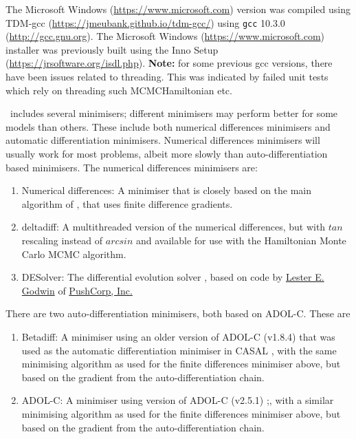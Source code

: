 The Microsoft Windows  (\url{https://www.microsoft.com}) version was compiled using TDM-gcc (\url{https://jmeubank.github.io/tdm-gcc/}) using \texttt{gcc} 10.3.0 (\url{http://gcc.gnu.org}). The Microsoft Windows (\url{https://www.microsoft.com}) installer was previously built using the Inno Setup (\url{https://jrsoftware.org/isdl.php}). \textbf{Note:} for some previous gcc versions, there have been issues related to threading. This was indicated by failed unit tests which rely on threading such MCMCHamiltonian etc.

\CNAME\ includes several minimisers; different minimisers may perform better for some models than others. These include both numerical differences minimisers and automatic differentiation minimisers. Numerical differences minimisers will usually work for most problems, albeit more slowly than auto-differentiation based minimisers. The numerical differences minimisers are:

\begin{enumerate}
\item Numerical differences: A minimiser that is closely based on the main algorithm of \cite{779}, that uses finite difference gradients.
\item deltadiff: A multithreaded version of the numerical differences, but with $tan$ rescaling instead of $arcsin$ and available for use with the Hamiltonian Monte Carlo MCMC algorithm.
\item DESolver: The differential evolution solver \citep{1442}, based on code by \href{mailto:<godwin@pushcorp.com>}{Lester E. Godwin} of \href{http://www.pushcorp.com}{PushCorp, Inc.}
\end{enumerate}

There are two auto-differentiation minimisers, both based on ADOL-C. These are
\begin{enumerate}
\item Betadiff: A minimiser using an older version of ADOL-C (v1.8.4) that was used as the automatic differentiation minimiser in CASAL \citep{1388}, with the same minimising algorithm as used for the finite differences minimiser above, but based on the gradient from the auto-differentiation chain.
\item ADOL-C: A minimiser using version of ADOL-C (v2.5.1) \citep{walther1996adolc};, with a similar minimising algorithm as used for the finite differences minimiser above, but based on the gradient from the auto-differentiation chain.
\end{enumerate}

